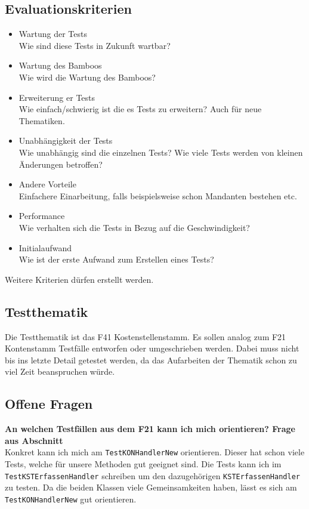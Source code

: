 \subsection{Evaluationskriterien} \label{Evaluationskriterien}
\begin{itemize}
\item Wartung der Tests\\
Wie sind diese Tests in Zukunft wartbar?
\item Wartung des Bamboos\\
Wie wird die Wartung des Bamboos?
\item Erweiterung er Tests\\
Wie einfach/schwierig ist die es Tests zu erweitern? Auch für neue Thematiken.
\item Unabhängigkeit der Tests\\
Wie unabhängig sind die einzelnen Tests? Wie viele Tests werden von kleinen Änderungen betroffen?
\item Andere Vorteile\\
Einfachere Einarbeitung, falls beispielsweise schon Mandanten bestehen etc.
\item Performance\\
Wie verhalten sich die Tests in Bezug auf die Geschwindigkeit?
\item Initialaufwand\\
Wie ist der erste Aufwand zum Erstellen eines Tests?
\end{itemize}
Weitere Kriterien dürfen erstellt werden.

\subsection{Testthematik} \label{Testthematik}
Die Testthematik ist das F41 Kostenstellenstamm. Es sollen analog zum F21 Kontenstamm Testfälle entworfen oder umgeschrieben werden. Dabei muss nicht bis ins letzte Detail getestet werden, da das Aufarbeiten der Thematik schon zu viel Zeit beanspruchen würde.

\subsection{Offene Fragen}\label{Offene Fragen}
\textbf{An welchen Testfällen aus dem F21 kann ich mich orientieren?  Frage aus Abschnitt } \\
Konkret kann ich mich am \texttt{TestKONHandlerNew} orientieren. Dieser hat schon viele Tests, welche für unsere Methoden gut geeignet sind. Die Tests kann ich im \texttt{TestKSTErfassenHandler} schreiben um den dazugehörigen \texttt{KSTErfassenHandler} zu testen. Da die beiden Klassen viele Gemeinsamkeiten haben, lässt es sich am \texttt{TestKONHandlerNew} gut orientieren.
